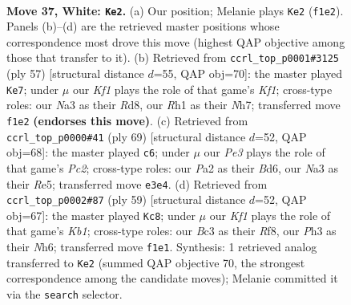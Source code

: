 \documentclass[11pt]{article}
\begin{document}
\clearpage

\begin{figure}[p]\centering
\begin{subfigure}{0.46\textwidth}\centering
\resizebox{\linewidth}{!}{%
\newchessgame
\chessboard[
  setfen={r1r5/pn3p1k/1p2p1pp/8/2P5/N1B1P2P/PR3PP1/5K1R w - - 3 37},
  showmover=false,
  pgfstyle=straightmove, color=movearrow, markmove={f1-e2}
]}
\caption{}
\end{subfigure}\hfill
\begin{subfigure}{0.46\textwidth}\centering
\resizebox{\linewidth}{!}{%
\newchessgame
\chessboard[
  setfen={3r1k2/1p3ppn/p1rp4/4p3/1P2P3/P4P1P/3RB1P1/3R2K1 b - - 0 29},
  showmover=false,
  pgfstyle=straightmove, color=movearrow, markmove={f8-e7}
]}
\caption{}
\end{subfigure}
\\[4pt]
\begin{subfigure}{0.46\textwidth}\centering
\resizebox{\linewidth}{!}{%
\newchessgame
\chessboard[
  setfen={8/2p3pk/3b1r2/P2pr2p/P3p3/2P3P1/5PNP/1R1R2K1 b - - 2 35},
  showmover=false,
  pgfstyle=straightmove, color=movearrow, markmove={c7-c6}
]}
\caption{}
\end{subfigure}\hfill
\begin{subfigure}{0.46\textwidth}\centering
\resizebox{\linewidth}{!}{%
\newchessgame
\chessboard[
  setfen={1k2rr2/2p5/p1p4n/1p2Ppb1/7p/7P/PPP3PB/3NRR1K b - - 1 30},
  showmover=false,
  pgfstyle=straightmove, color=movearrow, markmove={b8-c8}
]}
\caption{}
\end{subfigure}
\caption{\textbf{Move 37, White: \texttt{Ke2}.} (a) Our position; Melanie plays \texttt{Ke2} (\texttt{f1e2}). Panels (b)--(d) are the retrieved master positions whose correspondence most drove this move (highest QAP objective among those that transfer to it). (b) Retrieved from \texttt{ccrl\_top\_p0001\#3125} (ply 57) [structural distance $d$=55, QAP obj=70]: the master played \texttt{Ke7}; under $\mu$ our \emph{Kf1} plays the role of that game's \emph{Kf1}; cross-type roles: our \emph{N}a3 as their \emph{R}d8, our \emph{R}h1 as their \emph{N}h7; transferred move \texttt{f1e2} \textbf{(endorses this move)}. (c) Retrieved from \texttt{ccrl\_top\_p0000\#41} (ply 69) [structural distance $d$=52, QAP obj=68]: the master played \texttt{c6}; under $\mu$ our \emph{Pe3} plays the role of that game's \emph{Pc2}; cross-type roles: our \emph{P}a2 as their \emph{B}d6, our \emph{N}a3 as their \emph{R}e5; transferred move \texttt{e3e4}. (d) Retrieved from \texttt{ccrl\_top\_p0002\#87} (ply 59) [structural distance $d$=52, QAP obj=67]: the master played \texttt{Kc8}; under $\mu$ our \emph{Kf1} plays the role of that game's \emph{Kb1}; cross-type roles: our \emph{B}c3 as their \emph{R}f8, our \emph{P}h3 as their \emph{N}h6; transferred move \texttt{f1e1}. Synthesis: 1 retrieved analog transferred to \texttt{Ke2} (summed QAP objective 70, the strongest correspondence among the candidate moves); Melanie committed it via the \texttt{search} selector.}
\label{fig:thought-m72}
\end{figure}
\end{document}
